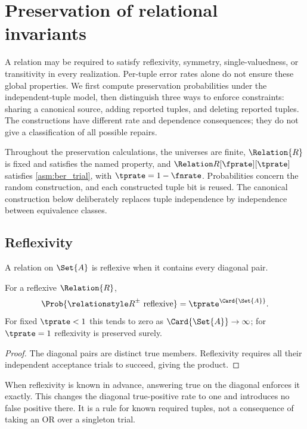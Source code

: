 \documentclass[ ../main.tex]{subfiles}
\begin{document}
\section{Preservation of relational invariants}
\label{sec:invariants}
A relation may be required to satisfy reflexivity, symmetry, single-valuedness,
or transitivity in every realization. Per-tuple error rates alone do not ensure
these global properties. We first compute preservation probabilities under the
independent-tuple model, then distinguish three ways to enforce constraints:
sharing a canonical source, adding reported tuples, and deleting reported tuples.
The constructions have different rate and dependence consequences; they do not
give a classification of all possible repairs.

Throughout the preservation calculations, the universes are finite,
$\Relation{R}$ is fixed and satisfies the named property, and
$\ARelation{R}[\fprate][\tprate]$ satisfies \cref{asm:ber_trial}, with
$\tprate=1-\fnrate$. Probabilities concern the random construction, and each
constructed tuple bit is reused. The canonical construction below deliberately
replaces tuple independence by independence between equivalence classes.

\subsection{Reflexivity}
\label{sec:reflexive}
A relation on $\Set{A}$ is reflexive when it contains every diagonal pair.

\begin{theorem}
\label{thm:reflexive}
For a reflexive $\Relation{R}$,
\begin{equation}
  \Prob{\ARelation{R}\text{ reflexive}}=\tprate^{\Card{\Set{A}}}.
\end{equation}
For fixed $\tprate<1$ this tends to zero as $\Card{\Set{A}}\to\infty$;
for $\tprate=1$ reflexivity is preserved surely.
\end{theorem}
\begin{proof}
The diagonal pairs are distinct true members. Reflexivity requires all their
independent acceptance trials to succeed, giving the product.
\end{proof}

When reflexivity is known in advance, answering true on the diagonal enforces it
exactly. This changes the diagonal true-positive rate to one and introduces no
false positive there. It is a rule for known required tuples, not a consequence
of taking an OR over a singleton trial.
\end{document}
